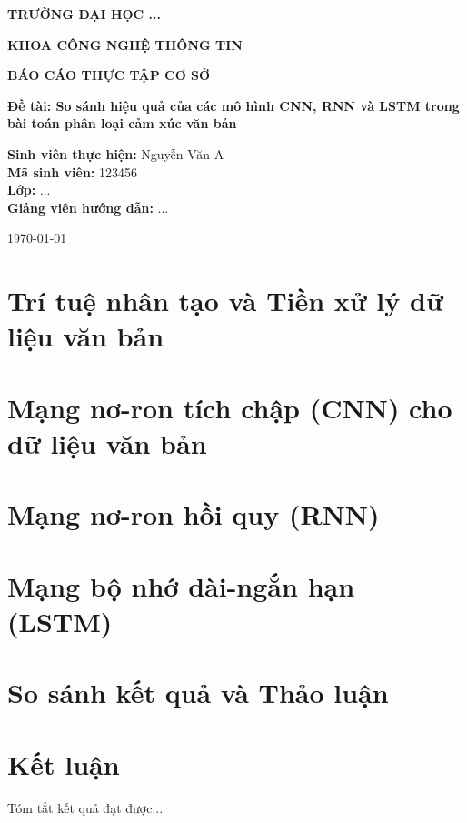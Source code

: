 \documentclass[12pt,a4paper]{report}
\begin{document}
\begin{titlepage}
    \centering
    \vspace*{1cm}
    {\Large \textbf{TRƯỜNG ĐẠI HỌC ...} \par}
    {\Large \textbf{KHOA CÔNG NGHỆ THÔNG TIN} \par}
    \vspace{2cm}
    \vspace{2cm}
    {\Huge \textbf{BÁO CÁO THỰC TẬP CƠ SỞ} \par}
    \vspace{1.5cm}
    {\Large \textbf{Đề tài: So sánh hiệu quả của các mô hình CNN, RNN và LSTM trong bài toán phân loại cảm xúc văn bản} \par}
    \vfill
    \begin{flushright}
        \textbf{Sinh viên thực hiện:} Nguyễn Văn A \\
        \textbf{Mã sinh viên:} 123456 \\
        \textbf{Lớp:} ... \\
        \textbf{Giảng viên hướng dẫn:} ...
    \end{flushright}
    \vspace{1cm}
    {\large \today}
\end{titlepage}

\tableofcontents
\listoffigures

\chapter{Trí tuệ nhân tạo và Tiền xử lý dữ liệu văn bản}


\chapter{Mạng nơ-ron tích chập (CNN) cho dữ liệu văn bản}


\chapter{Mạng nơ-ron hồi quy (RNN)}


\chapter{Mạng bộ nhớ dài-ngắn hạn (LSTM)}


\chapter{So sánh kết quả và Thảo luận}


\chapter*{Kết luận}
Tóm tắt kết quả đạt được...
\end{document}

